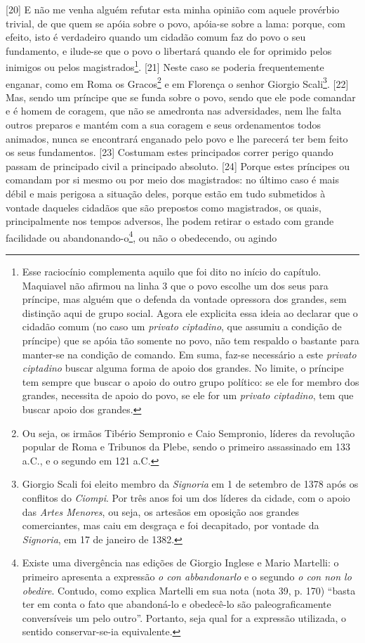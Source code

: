 {[}20{]} E não me venha alguém refutar esta minha opinião com aquele
provérbio trivial, de que quem se apóia sobre o povo, apóia-se sobre a
lama: porque, com efeito, isto é verdadeiro quando um cidadão comum faz
do povo o seu fundamento, e ilude-se que o povo o libertará quando ele
for oprimido pelos inimigos ou pelos magistrados\footnote{Esse
  raciocínio complementa aquilo que foi dito no início do capítulo.
  Maquiavel não afirmou na linha 3 que o povo escolhe um dos seus para
  príncipe, mas alguém que o defenda da vontade opressora dos grandes,
  sem distinção aqui de grupo social. Agora ele explicita essa ideia ao
  declarar que o cidadão comum (no caso um \emph{privato ciptadino}, que
  assumiu a condição de príncipe) que se apóia tão somente no povo, não
  tem respaldo o bastante para manter-se na condição de comando. Em
  suma, faz-se necessário a este \emph{privato ciptadino} buscar alguma
  forma de apoio dos grandes. No limite, o príncipe tem sempre que
  buscar o apoio do outro grupo político: se ele for membro dos grandes,
  necessita de apoio do povo, se ele for um \emph{privato ciptadino},
  tem que buscar apoio dos grandes.}. {[}21{]} Neste caso se poderia
frequentemente enganar, como em Roma os Gracos\footnote{Ou seja, os
  irmãos Tibério Sempronio e Caio Sempronio, líderes da revolução
  popular de Roma e Tribunos da Plebe, sendo o primeiro assassinado em
  133 a.C., e o segundo em 121 a.C.} e em Florença o senhor Giorgio
Scali\footnote{Giorgio Scali foi eleito membro da \emph{Signoria} em 1
  de setembro de 1378 após os conflitos do \emph{Ciompi}. Por três anos
  foi um dos líderes da cidade, com o apoio das \emph{Artes Menores}, ou
  seja, os artesãos em oposição aos grandes comerciantes, mas caiu em
  desgraça e foi decapitado, por vontade da \emph{Signoria}, em 17 de
  janeiro de 1382.}. {[}22{]} Mas, sendo um príncipe que se funda sobre
o povo, sendo que ele pode comandar e é homem de coragem, que não se
amedronta nas adversidades, nem lhe falta outros preparos e mantém com a
sua coragem e seus ordenamentos todos animados, nunca se encontrará
enganado pelo povo e lhe parecerá ter bem feito os seus fundamentos.
{[}23{]} Costumam estes principados correr perigo quando passam de
principado civil a principado absoluto. {[}24{]} Porque estes príncipes
ou comandam por si mesmo ou por meio dos magistrados: no último caso é
mais débil e mais perigosa a situação deles, porque estão em tudo
submetidos à vontade daqueles cidadãos que são prepostos como
magistrados, os quais, principalmente nos tempos adversos, lhe podem
retirar o estado com grande facilidade ou abandonando-o\footnote{Existe
  uma divergência nas edições de Giorgio Inglese e Mario Martelli: o
  primeiro apresenta a expressão \emph{o con abbandonarlo} e o segundo
  \emph{o con non lo obedire}. Contudo, como explica Martelli em sua
  nota (nota 39, p. 170) ``basta ter em conta o fato que abandoná-lo e
  obedecê-lo são paleograficamente conversíveis um pelo outro''.
  Portanto, seja qual for a expressão utilizada, o sentido
  conservar-se-ia equivalente.}, ou não o obedecendo, ou agindo
